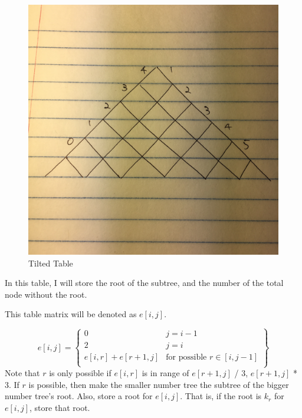 \documentclass[a4paper,11pt]{article}
\begin{document}
\begin{enumerate}
\begin{figure}[hbt]
	\centering
	\includegraphics[scale=0.04]{figure2.jpg}
	\caption{Tilted Table}
\end{figure}

In this table, I will store the root of the subtree, and the number of the total node without the root.

This table matrix will be denoted as $e[i,j]$.

\[
  e[i,j] = \left.
  \begin{cases}
    0 &  j=i-1 \\
    2 &  j=i \\
    e[i,r]+e[r+1,j]  & \text{for possible }  r \in [i,j-1] \\
  \end{cases}
  \right\} 
\]
Note that $r$ is only possible if $e[i,r]$ is in range of $e[r+1,j]$ / 3, $e[r+1,j]$ * 3.
If $r$ is possible, then make the smaller number tree the subtree of the bigger number tree's root.
Also, store a root for $e[i,j]$. That is, if the root is $k_r$ for $e[i,j]$, store that root.


\end{enumerate}
\end{document}
